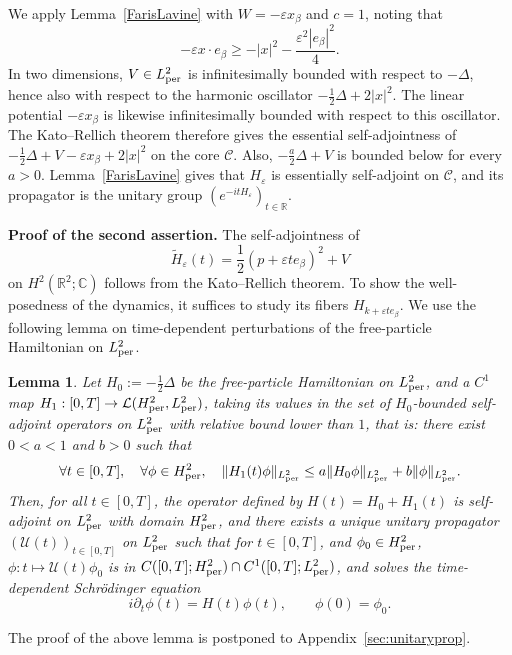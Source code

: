 \documentclass[a4paper,11pt]{article}
\theoremstyle{plain}
\newtheorem{lemma}[theorem]{Lemma}
\theoremstyle{remark}
\def\R{{\mathbb R}}
\def\C{{\mathbb C}}
\def\eps{{\varepsilon}}
\begin{document}
We apply Lemma~\ref{FarisLavine} with $W=-\eps x_\beta$ and $c=1$,
noting that
\[
-\eps x\cdot e_\beta\ge-|x|^2-\frac{\eps^2|e_\beta|^2}{4}.
\]
In two dimensions, $V\in L^2_{\rm per}$ is infinitesimally bounded with
respect to $-\Delta$, hence also with respect to the harmonic oscillator
$-\frac12\Delta+2|x|^2$. The linear potential $-\eps x_\beta$ is likewise
infinitesimally bounded with respect to this oscillator. The Kato--Rellich
theorem therefore gives the essential self-adjointness of
$-\frac12\Delta+V-\eps x_\beta+2|x|^2$ on the core $\mathcal C$.
Also, $-\frac a2\Delta+V$ is bounded below for every $a>0$.
Lemma~\ref{FarisLavine} gives that $H_\eps$ is essentially self-adjoint on
$\mathcal C$, and its propagator is the unitary group
$(e^{-itH_\eps})_{t\in\R}$.

\medskip

{\bf Proof of the second assertion.}
The self-adjointness of
\[
\widetilde H_\eps(t)=\frac12(p+\eps te_\beta)^2+V
\]
on $H^2(\R^2;\C)$ follows from the Kato--Rellich theorem.
To show the well-posedness of the dynamics, it suffices to study its
fibers $H_{k+\eps te_\beta}$. We use the following lemma on time-dependent
perturbations of the free-particle Hamiltonian on $L^2_{\rm per}$.


\begin{lemma}
\label{lemmaUnitaryPropagator} Let $H_{0}:=-\frac 12\Delta$ be the free-particle Hamiltonian on $L^2_{\rm per}$, and a $C^1$ map $H_{1}:[0,T]\to\mathcal L(H_{\rm per}^{2},L^2_{\rm per})$,
taking its values in the set of $H_{0}$-bounded self-adjoint operators on $L^2_{\rm per}$ with relative bound lower than $1$, that is: there exist $0<a<1$ and $b>0$ such that
\begin{align}
  \label{eq:hyp_lap_bounded}
\forall t \in [0,T],\quad \forall \phi \in H_{\rm per}^{2}, \quad \|H_{1}(t)\phi\|_{L^2_{\rm per}} \leq a \|H_{0} \phi \|_{L^2_{\rm per}} + b \|\phi\|_{L^2_{\rm per}}.
\end{align}
Then, for all $t \in [0,T]$, the operator defined by
 $H(t) = H_{0} + H_{1}(t)$
 is self-adjoint on $L^2_{\rm per}$ with domain $H_{\rm per}^{2}$, and there exists a unique unitary propagator $(\mathcal{U}(t))_{t\in[0,T]}$ on $L^2_{\rm per}$ such that for $t \in [0,T]$, and $\phi_0 \in H_{\rm per}^{2}$, $\phi: t \mapsto \mathcal{U}(t)\phi_0$ is in $C([0,T];H_{\rm per}^{2})\cap C^1([0,T];L^2_{\rm per})$, and solves the time-dependent Schr\"odinger equation
\[i \partial_t \phi(t) = H(t) \phi (t), \qquad \phi(0) = \phi_0.\]
\end{lemma}
The proof of the above lemma is postponed to Appendix~\ref{sec:unitaryprop}.
\end{document}

